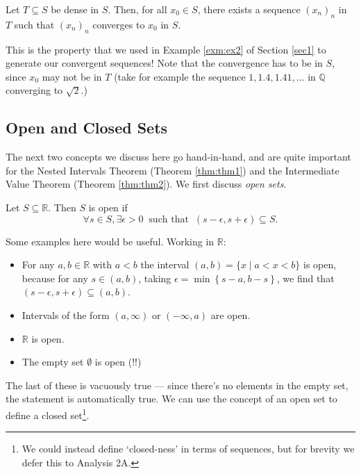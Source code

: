 \documentclass[
  10pt,
  a4paper]{article}
\providecommand{\tightlist}{%
  \setlength{\itemsep}{0pt}\setlength{\parskip}{0pt}}
\theoremstyle{plain}
\theoremstyle{plain}
\theoremstyle{plain}
\theoremstyle{plain}
\theoremstyle{plain}
\theoremstyle{definition}
\theoremstyle{definition}
\theoremstyle{definition}
\theoremstyle{remark}
\let\BeginKnitrBlock\begin \let\EndKnitrBlock\end
\begin{document}
\BeginKnitrBlock{proposition}
{\label{prp:prop1} }Let \(T \subseteq S\) be dense in \(S\). Then, for all \(x_0 \in S\), there exists a sequence \((x_n)_n\) in \(T\) such that \((x_n)_n\) converges to \(x_0\) in \(S\).
\EndKnitrBlock{proposition}
This is the property that we used in Example \ref{exm:ex2} of Section \ref{sec1} to generate our convergent sequences! Note that the convergence has to be in \(S\), since \(x_0\) may not be in \(T\) (take for example the sequence \(1, 1.4, 1.41,\ldots\) in \(\mathbb{Q}\) converging to \(\sqrt{2}\).)

\hypertarget{open-and-closed-sets}{%
\subsection{Open and Closed Sets}\label{open-and-closed-sets}}

The next two concepts we discuss here go hand-in-hand, and are quite important for the Nested Intervals Theorem (Theorem \ref{thm:thm1}) and the Intermediate Value Theorem (Theorem \ref{thm:thm2}). We first discuss \emph{open sets}.

\BeginKnitrBlock{definition}[Open Set]
{\label{def:def4} }Let \(S \subseteq \mathbb{R}\). Then \(S\) is open if \[\forall s \in S, \exists \epsilon > 0 \;\; \text{such that} \;\; (s-\epsilon,s+\epsilon) \subseteq S.\]
\EndKnitrBlock{definition}
Some examples here would be useful. Working in \(\mathbb{R}\):

\begin{itemize}
\tightlist
\item
  For any \(a,b \in \mathbb{R}\) with \(a < b\) the interval \((a,b) = \lbrace x \;\lvert\; a < x < b \rbrace\) is open, because for any \(s \in (a,b)\), taking \(\epsilon = \min\left\lbrace s-a, b-s\right\rbrace\), we find that \((s-\epsilon, s + \epsilon) \subseteq (a,b)\).
\item
  Intervals of the form \((a, \infty)\) or \((-\infty, a)\) are open.
\item
  \(\mathbb{R}\) is open.
\item
  The empty set \(\emptyset\) is open (!!)
\end{itemize}

The last of these is vacuously true --- since there's no elements in the empty set, the statement is automatically true. We can use the concept of an open set to define a closed set\footnote{We could instead define `closed-ness' in terms of sequences, but for brevity we defer this to Analysis 2A.}.
\end{document}
